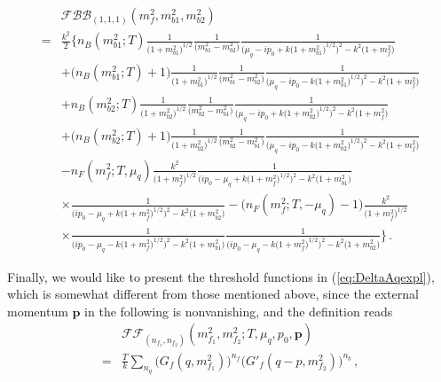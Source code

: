 \documentclass[%
reprint,
superscriptaddress,
showpacs,preprintnumbers,
 amsmath,amssymb,
 aps,
prd,
]{revtex4-1}
\def\eq#1{(\ref{#1})}
\begin{document}
\begin{widetext}
\begin{align}
  &\mathcal{FBB}_{(1,1,1)}(m_f^2,m_{b1}^2,m_{b2}^2)\nonumber \\[1ex]
  =
  &\frac{k^2}{2}\bigg\{n_{B}(m_{b1}^2;T)\frac{1}{\big(1+m_{b1}^2\big)^{1/2}}
    \frac{1}{\big(m_{b1}^2-m_{b2}^2\big)}\frac{1}{\Big(\mu_q-ip_0+k\big(1+
    m_{b1}^2\big)^{1/2}\Big)^2-k^2\big(1+m_f^2\big)}\nonumber \\[1ex]
  &+\big(n_{B}(m_{b1}^2;T)+1\big)\frac{1}{\big(1+m_{b1}^2\big)^{1/2}}
    \frac{1}{\big(m_{b1}^2-m_{b2}^2\big)}\frac{1}{\Big(\mu_q-ip_0-k\big(1
    +m_{b1}^2\big)^{1/2}\Big)^2-k^2\big(1+m_f^2\big)}\nonumber\\[1ex]
  &+n_{B}(m_{b2}^2;T)\frac{1}{\big(1+m_{b2}^2\big)^{1/2}}\frac{1}{
    \big(m_{b2}^2-m_{b1}^2\big)}\frac{1}{\Big(\mu_q-ip_0+k\big(1+
    m_{b2}^2\big)^{1/2}\Big)^2-k^2\big(1+m_f^2\big)}\nonumber \\[1ex]
  &+\big(n_{B}(m_{b2}^2;T)+1\big)\frac{1}{\big(1+m_{b2}^2\big)^{1/2}}
    \frac{1}{\big(m_{b2}^2-m_{b1}^2\big)}\frac{1}{\Big(\mu_q-ip_0
    -k\big(1+m_{b2}^2\big)^{1/2}\Big)^2-k^2\big(1+m_f^2\big)}
    \nonumber\\[1ex]
  &-n_{F}(m_f^2;T,\mu_q)\frac{k^2}{\big(1+m_f^2\big)^{1/2}}
    \frac{1}{\Big(ip_0-\mu_q+k\big(1+m_f^2\big)^{1/2}\Big)^2
    -k^2\big(1+m_{b1}^2\big)}\nonumber\\[1ex]
  &\times\frac{1}{\Big(ip_0-\mu_q+k\big(1+m_f^2\big)^{1/2}
    \Big)^2-k^2\big(1+m_{b2}^2\big)}-\big(n_{F}(m_f^2;T,
    -\mu_q)-1\big)\frac{k^2}{\big(1+m_f^2\big)^{1/2}}
    \nonumber\\[1ex]
  &\times\frac{1}{\Big(ip_0-\mu_q-k\big(1+m_f^2
    \big)^{1/2}\Big)^2-k^2\big(1+m_{b1}^2\big)}\frac{1}{
    \Big(ip_0
    -\mu_q-k\big(1+m_f^2\big)^{1/2}\Big)^2-k^2
    \big(1+m_{b2}^2\big)}\bigg\}\,.
\label{eq:f1b1b1}
\end{align}
\end{widetext}
%
Finally, we would like to present the threshold functions in
\eq{eq:DeltaAqexpl}, which is somewhat different from those mentioned
above, since the external momentum $\bm{p}$ in the following is
nonvanishing, and the definition reads
%
\begin{align}
  &\mathcal{FF}_{(n_{f_1},n_{f_2})}(m_{f_1}^2,m_{f_2}^2;T,\mu_q,p_0,
    \bm{p})\nonumber \\[1ex]  
  =&\frac{T}{k}\sum_{n_q}\Big(G_{f}(q,m_{f_1}^2)\Big)^{n_f}
     \Big(G'_{f}(q-p,m_{f_2}^2)\Big)^{n_b}\,,\label{eq:FF}
\end{align}
\end{document}
